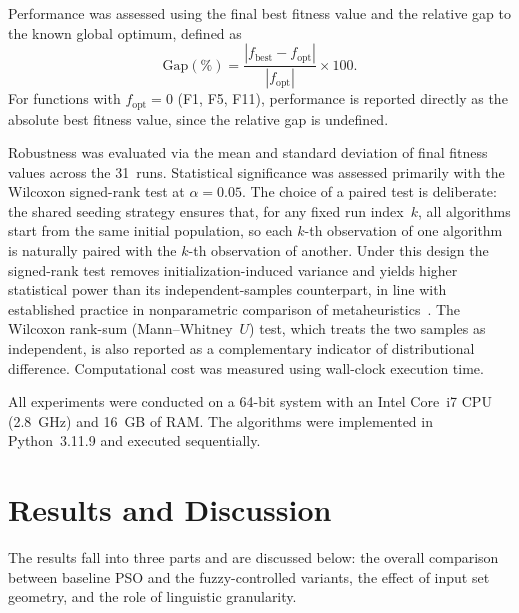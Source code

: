 \documentclass[conference]{IEEEtran}
\newcommand{\new}[1]{{\color{red}#1}}
\begin{document}
Performance was assessed using the final best fitness value and the relative gap to the known global optimum, defined as
\begin{equation}
    \text{Gap}(\%) =
    \frac{\left| f_{\text{best}} - f_{\text{opt}} \right|}
    {\left| f_{\text{opt}} \right|} \times 100.
    \label{eq:gap_metric}
\end{equation}
For functions with $f_{\text{opt}} = 0$ (F1, F5, F11), performance is reported directly as the absolute best fitness value, since the relative gap is undefined.

Robustness was evaluated via the mean and standard deviation of final fitness values across the 31~runs. %
\new{Statistical significance was assessed primarily with the Wilcoxon signed-rank test at $\alpha = 0.05$. The choice of a paired test is deliberate: the shared seeding strategy ensures that, for any fixed run index~$k$, all algorithms start from the same initial population, so each $k$-th observation of one algorithm is naturally paired with the $k$-th observation of another. Under this design the signed-rank test removes initialization-induced variance and yields higher statistical power than its independent-samples counterpart, in line with established practice in nonparametric comparison of metaheuristics~\cite{derrac2011practical}. The Wilcoxon rank-sum (Mann--Whitney~$U$) test, which treats the two samples as independent, is also reported as a complementary indicator of distributional difference.} Computational cost was measured using wall-clock execution time.

All experiments were conducted on a 64-bit system with an Intel Core~i7 CPU (2.8~GHz) and 16~GB of RAM. The algorithms were implemented in Python~3.11.9 and executed sequentially.




\section{Results and Discussion}
\label{sec:results}

The results fall into three parts and are discussed below: the overall comparison between baseline PSO and the fuzzy-controlled variants, the effect of input set geometry, and the role of linguistic granularity.
\end{document}
